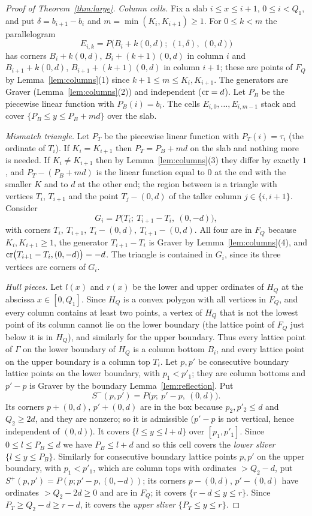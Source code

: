 \begin{proof}[Proof of Theorem~\ref{thm:large}]
\emph{Column cells.} Fix a slab $i\le x\le i+1$, $0\le i<Q_1$, and put $\delta=b_{i+1}-b_i$ and $m=\min(K_i,K_{i+1})\ge1$. For $0\le k<m$ the parallelogram
\[
  E_{i,k}=P\bigl(B_i+k(0,d);\ (1,\delta),\ (0,d)\bigr)
\]
has corners $B_i+k(0,d)$, $B_i+(k+1)(0,d)$ in column $i$ and $B_{i+1}+k(0,d)$, $B_{i+1}+(k+1)(0,d)$ in column $i+1$; these are points of $F_Q$ by Lemma~\ref{lem:columns}(1) since $k+1\le m\le K_i,K_{i+1}$. The generators are Graver (Lemma~\ref{lem:columns}(2)) and independent ($\operatorname{cr}=d$). Let $P_B$ be the piecewise linear function with $P_B(i)=b_i$. The cells $E_{i,0},\dots,E_{i,m-1}$ stack and cover $\{P_B\le y\le P_B+md\}$ over the slab.

\emph{Mismatch triangle.} Let $P_T$ be the piecewise linear function with $P_T(i)=\tau_i$ (the ordinate of $T_i$). If $K_i=K_{i+1}$ then $P_T=P_B+md$ on the slab and nothing more is needed. If $K_i\ne K_{i+1}$ then by Lemma~\ref{lem:columns}(3) they differ by exactly $1$, and $P_T-(P_B+md)$ is the linear function equal to $0$ at the end with the smaller $K$ and to $d$ at the other end; the region between is a triangle with vertices $T_i$, $T_{i+1}$ and the point $T_j-(0,d)$ of the taller column $j\in\{i,i+1\}$. Consider
\[
  G_i=P\bigl(T_i;\ T_{i+1}-T_i,\ (0,-d)\bigr),
\]
with corners $T_i,\ T_{i+1},\ T_i-(0,d),\ T_{i+1}-(0,d)$. All four are in $F_Q$ because $K_i,K_{i+1}\ge1$, the generator $T_{i+1}-T_i$ is Graver by Lemma~\ref{lem:columns}(4), and $\operatorname{cr}\bigl(T_{i+1}-T_i,(0,-d)\bigr)=-d$. The triangle is contained in $G_i$, since its three vertices are corners of $G_i$.

\emph{Hull pieces.} Let $l(x)$ and $r(x)$ be the lower and upper ordinates of $H_Q$ at the abscissa $x\in[0,Q_1]$. Since $H_Q$ is a convex polygon with all vertices in $F_Q$, and every column contains at least two points, a vertex of $H_Q$ that is not the lowest point of its column cannot lie on the lower boundary (the lattice point of $F_Q$ just below it is in $H_Q$), and similarly for the upper boundary. Thus every lattice point of $\Gamma$ on the lower boundary of $H_Q$ is a column bottom $B_i$, and every lattice point on the upper boundary is a column top $T_i$. Let $p,p'$ be consecutive boundary lattice points on the lower boundary, with $p_1<p'_1$; they are column bottoms and $p'-p$ is Graver by the boundary Lemma~\ref{lem:reflection}. Put
\[
  S^-(p,p')=P\bigl(p;\ p'-p,\ (0,d)\bigr).
\]
Its corners $p+(0,d)$, $p'+(0,d)$ are in the box because $p_2,p'_2\le d$ and $Q_2\ge2d$, and they are nonzero; so it is admissible ($p'-p$ is not vertical, hence independent of $(0,d)$). It covers $\{l\le y\le l+d\}$ over $[p_1,p'_1]$. Since $0\le l\le P_B\le d$ we have $P_B\le l+d$ and so this cell covers the \emph{lower sliver} $\{l\le y\le P_B\}$. Similarly for consecutive boundary lattice points $p,p'$ on the upper boundary, with $p_1<p'_1$, which are column tops with ordinates $>Q_2-d$, put $S^+(p,p')=P(p;p'-p,(0,-d))$; its corners $p-(0,d)$, $p'-(0,d)$ have ordinates $>Q_2-2d\ge0$ and are in $F_Q$; it covers $\{r-d\le y\le r\}$. Since $P_T\ge Q_2-d\ge r-d$, it covers the \emph{upper sliver} $\{P_T\le y\le r\}$.


\end{proof}
